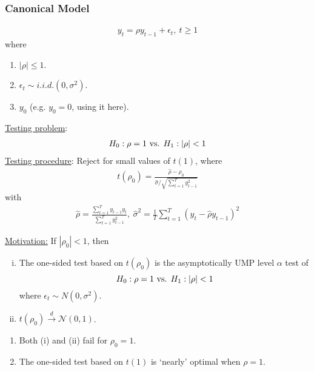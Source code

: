 \documentclass[11pt]{elegantbook}
\begin{document}
\subsubsection*{Canonical Model}
\begin{equation}
    \begin{aligned}
        y_t=\rho y_{t-1}+\epsilon_t,\ t\geq 1
    \end{aligned}
    \nonumber
\end{equation}
where
\begin{enumerate}
    \item $|\rho|\leq 1$.
    \item $\epsilon_t\sim{i.i.d.}(0,\sigma^2)$.
    \item $y_0$ (e.g. $y_0=0$, using it here).
\end{enumerate}
\underline{Testing problem}:
\begin{equation}
    \begin{aligned}
        H_0: \rho=1 \textnormal{ vs. } H_1: |\rho|<1
    \end{aligned}
    \nonumber
\end{equation}
\underline{Testing procedure}:
Reject for small values of $t(1)$, where
\begin{equation}
    \begin{aligned}
        t(\rho_0)=\frac{\hat{\rho}-\rho_0}{\hat{\sigma}/\sqrt{\sum_{t=1}^Ty_{t-1}^2}}
    \end{aligned}
    \nonumber
\end{equation}
with
\begin{equation}
    \begin{aligned}
        \hat{\rho}=\frac{\sum_{t=1}^Ty_{t-1}y_t}{\sum_{t=1}^Ty_{t-1}^2},\ \hat{\sigma}^2=\frac{1}{T}\sum_{t=1}^T(y_t-\hat{\rho}y_{t-1})^2
    \end{aligned}
    \nonumber
\end{equation}


\underline{Motivation:} If $|\rho_0|<1$, then
\begin{enumerate}[(i).]
    \item The one-sided test based on $t(\rho_0)$ is the asymptotically UMP level $\alpha$ test of $$H_0: \rho=1 \textnormal{ vs. } H_1: |\rho|<1$$ where $\epsilon_t\sim N(0,\sigma^2)$.
    \item $t(\rho_0)\stackrel{d}{\longrightarrow} \mathcal{N}(0,1)$.
\end{enumerate}
\begin{note}
    \begin{enumerate}
        \item Both (i) and (ii) fail for $\rho_0=1$.
        \item The one-sided test based on $t(1)$ is `nearly' optimal when $\rho=1$.
    \end{enumerate}
\end{note}
\end{document}
